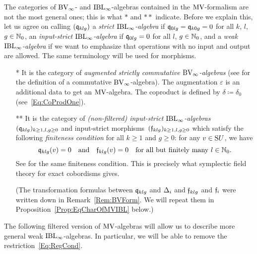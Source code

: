 \documentclass[\MainFolder/Text.tex]{subfiles}
\begin{document}
The categories of $\mathrm{BV}_\infty$- and $\mathrm{IBL}_\infty$-algebras contained in the $\mathrm{MV}$-formalism are not the most general ones; this is what $*$ and $**$ indicate. Before we explain this, let us agree on calling $(\mathfrak{q}_{klg})$ a \emph{strict $\mathrm{IBL}_\infty$-algebra} if $\mathfrak{q}_{0lg}=\mathfrak{q}_{k0g}=0$ for all $k$, $l$, $g\in \mathbb{N}_0$, an \emph{input-strict $\mathrm{IBL}_\infty$-algebra} if $\mathfrak{q}_{0lg} = 0$ for all $l$, $g\in \mathbb{N}_0$, and a \emph{weak $\mathrm{IBL}_\infty$-algebra} if we want to emphasize that operations with no input and output are allowed. The same terminology will be used for morphisms.
\begin{itemize}
\item[*] It is the category of \emph{augmented strictly commutative $\mathrm{BV}_\infty$-algebras} (see \cite[Section~5]{Cieliebak2007} for the definition of a commutative $\mathrm{BV}_\infty$-algebra). The augmentation $\varepsilon$ is an additional data to get an $\mathrm{MV}$-algebra. The coproduct is defined by $\delta\coloneqq \delta_{0}$ (see~\eqref{Eq:CoProdOne}).
\item[**] It is the category of \emph{(non-filtered) input-strict $\mathrm{IBL}_\infty$-algebras} $(\mathfrak{q}_{klg})_{k \ge 1, l, g\ge 0}$ and input-strict morphisms~$(\mathfrak{f}_{klg})_{k\ge 1,l, g\ge 0}$ which satisfy the following \emph{finiteness condition} for all $k\ge 1$ and $g\ge 0$: for any $v\in \mathrm{S} U$, we have
\begin{equation}\label{Eq:RegCond}
\mathfrak{q}_{klg}(v) = 0\quad\text{and}\quad\mathfrak{f}_{klg}(v) = 0 \quad\text{for all but finitely many }l\in \mathbb{N}_0.
\end{equation}
See \cite[Remark~(6), p.\,14]{Cieliebak2015} for the same finiteness condition. This is precisely what symplectic field theory for exact cobordisms gives.

(The transformation formulas between $\mathfrak{q}_{klg}$ and $\operatorname{\Delta}_i$ and $\mathfrak{f}_{klg}$ and $\mathfrak{f}_i$ were written down in Remark~\ref{Rem:BVForm}. We will repeat them in Proposition~\ref{Prop:EqCharOfMVIBL} below.)
\end{itemize}


The following filtered version of $\mathrm{MV}$-algebras will allow us to describe more general weak $\mathrm{IBL}_\infty$-algebras. In particular, we will be able to remove the restriction~\eqref{Eq:RegCond}.
\end{document}
